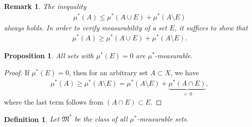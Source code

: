 \documentclass[11pt]{book}
\newtheorem{definition}{Definition}[chapter]
\newtheorem{proposition}{Proposition}[chapter]
\newtheorem{remark}{Remark}[chapter]
\theoremstyle{definition}
\numberwithin{equation}{chapter}
\def\MM{\mathfrak{M}}
\begin{document}
\begin{remark}
The inequality 
\begin{align*}
    \mu^*(A) \leq \mu^*(A \cup E) + \mu^*(A \setminus E)
\end{align*}
always holds. In order to verify measurability of a set $E$, it suffices to show that 
\begin{align*}
    \mu^*(A) \geq \mu^*(A \cup E) + \mu^*(A \setminus E).
\end{align*}
\end{remark}

\medskip

\begin{proposition}\label{prop_14}
All sets with $\mu^*(E) = 0$ are $\mu^*$-measurable.
\end{proposition}
\begin{proof}
If $\mu^*(E) = 0$, then for an arbitrary set $A \subset X$, we have
\begin{align*}
    \mu^*(A) \geq \mu^*(A \setminus E) = \mu^*(A \setminus E) + \underbrace{\mu^*(A \cap E)}_{=\,0},
\end{align*}
where the last term follows from $(A \cap E) \subset E$.
\end{proof}

\medskip

\begin{definition}
Let $\MM^*$ be the class of all $\mu^*$-measurable sets.
\end{definition}

\medskip
\end{document}
